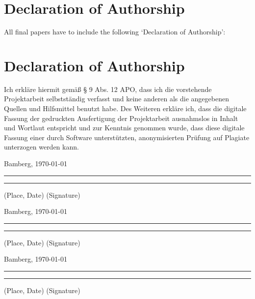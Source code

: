 \documentclass[12pt,a4paper]{article}
\begin{document}
\section*{Declaration of Authorship}
All final papers have to include the following ‘Declaration of Authorship’:

{\parindent 0cm
\section*{Declaration of Authorship}
Ich erkläre hiermit gemäß § 9 Abs. 12 APO, dass ich die vorstehende Projektarbeit selbstständig verfasst und keine anderen als die angegebenen Quellen und Hilfsmittel benutzt habe. Des Weiteren erkläre ich, dass die digitale Fassung der gedruckten Ausfertigung der Projektarbeit ausnahmslos in Inhalt und Wortlaut entspricht und zur Kenntnis genommen wurde, dass diese digitale Fassung einer durch Software unterstützten, anonymisierten Prüfung auf Plagiate unterzogen werden kann.\\
\vspace{2\baselineskip}
  
Bamberg, \today

\rule[0.5em]{14em}{0.5pt} \hspace{0.25\linewidth}\rule[0.5em]{14em}{0.5pt}
\vspace{1em}
\hspace{4em} (Place, Date) \hspace{0.51\linewidth} (Signature)

Bamberg, \today

\rule[0.5em]{14em}{0.5pt} \hspace{0.25\linewidth}\rule[0.5em]{14em}{0.5pt}
\vspace{1em}
\hspace{4em} (Place, Date) \hspace{0.51\linewidth} (Signature)

Bamberg, \today

\rule[0.5em]{14em}{0.5pt} \hspace{0.25\linewidth}\rule[0.5em]{14em}{0.5pt}
\vspace{1em}
\hspace{4em} (Place, Date) \hspace{0.51\linewidth} (Signature)


}





\end{document}
